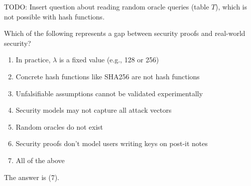 \begin{exercise}
  TODO: Insert question about reading random oracle queries (table $T$), which is not possible with hash functions.
\end{exercise}

\begin{exercise}
  Which of the following represents a gap between security proofs and real-world security?
  \begin{enumerate}
    \item In practice, $\lambda$ is a fixed value (e.g., 128 or 256)
    \item Concrete hash functions like SHA256 are not hash functions
    \item Unfalsifiable assumptions cannot be validated experimentally
    \item Security models may not capture all attack vectors
    \item Random oracles do not exist
    \item Security proofs don't model users writing keys on post-it notes
    \item All of the above
  \end{enumerate}
\end{exercise}

\ifsolutions
\begin{mysolution}
  The answer is (7).
\end{mysolution}
\fi
